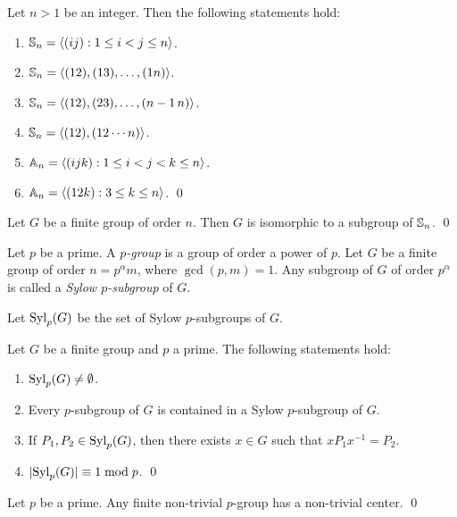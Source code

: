 \begin{theorem}
Let $n>1$ be an integer. Then the following statements hold:  
\begin{enumerate}
    \item $\mathbb{S}_n=\langle (ij):1\leq i<j\leq n\rangle$. 
	\item $\mathbb{S}_n=\langle (12),(13),\dots,(1n)\rangle$.
	\item $\mathbb{S}_n=\langle (12),(23),\dots,(n-1\,n)\rangle$.
	\item $\mathbb{S}_n=\langle (12),(12\cdots n)\rangle$.
	\item $\mathbb{A}_n=\langle (ijk):1\leq i<j<k\leq n\rangle$.
	\item $\mathbb{A}_n=\langle (12k):3\leq k\leq n\rangle$. \qed
    \end{enumerate}
\end{theorem}

\begin{theorem}
    Let $G$ be a finite group of order $n$. Then $G$ is isomorphic to a subgroup of $\mathbb{S}_n$. \qed
\end{theorem}

Let $p$ be a prime. A {\em $p$-group} is a group of order a power of $p$. Let $G$ be a finite group of order
$n=p^\alpha m$, where $\gcd(p,m)=1$. 
Any subgroup of $G$ of order $p^\alpha$ is called a {\em Sylow $p$-subgroup} of $G$. 

Let 
$\mathrm{Syl}_p(G)$ be the set of Sylow $p$-subgroups of $G$. 

\begin{theorem}[Sylow]
    Let $G$ be a finite group and $p$ a prime. The following statements hold:
    \begin{enumerate}
        \item $\mathrm{Syl}_p(G)\ne\emptyset$.
        \item 
        Every $p$-subgroup of $G$ is contained in a Sylow $p$-subgroup of $G$.
        \item 
        If $P_1,P_2\in\mathrm{Syl}_p(G)$, then  
        there exists $x\in G$ such that $xP_1x^{-1}=P_2$. 
        \item 
        $|\mathrm{Syl}_p(G)|\equiv 1\bmod p$. \qed
    \end{enumerate}
\end{theorem}

\begin{theorem}
    Let $p$ be a prime. Any finite non-trivial $p$-group has a non-trivial center. \qed
\end{theorem}


